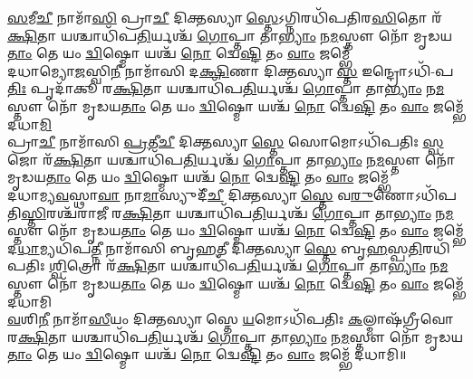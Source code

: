 \-\ul{𑌸}\-𑌮𑍀\-\ul{𑌚𑍀} 𑌨𑌾𑌮𑌾᳴\-\ul{𑌸𑌿} 𑌪𑍍𑌰𑌾\-\ul{𑌚𑍀} 𑌦𑌿𑌕𑍍𑌤𑌸𑍍𑌯𑌾\-\ul{𑌸𑍍𑌤𑍇}\-𑌽𑌗𑍍𑌨𑌿𑌰𑌧𑌿᳴\-𑌪𑌤𑌿𑌰\-\ul{𑌸𑌿}\-𑌤𑍋 𑌰᳴\-\ul{𑌕𑍍𑌷𑌿}\-𑌤𑌾 
𑌯𑌶𑍍𑌚𑌾𑌧𑌿᳴𑌪\-\ul{𑌤𑌿}\-𑌰𑍍𑌯𑌶𑍍𑌚᳴ \ul{𑌗𑍋}\-𑌪𑍍𑌤𑌾 𑌤𑌾\-\ul{𑌭𑍍𑌯𑌾𑌂} 𑌨\-\ul{𑌮}\-𑌸𑍍𑌤𑍗 𑌨𑍋᳴ 𑌮𑍃𑌡𑌯\-\ul{𑌤𑌾𑌂} 𑌤𑍇 
𑌯𑌂 \ul{𑌦𑍍𑌵𑌿}\-𑌷𑍍𑌮𑍋 𑌯𑌶𑍍𑌚᳴ \ul{𑌨𑍋} 𑌦𑍍𑌵𑍇\-\ul{𑌷𑍍𑌟𑌿} 𑌤𑌂 \ul{𑌵𑌾𑌂} 𑌜𑌮𑍍𑌭𑍇᳴\\
𑌦𑌧𑌾𑌮𑍍𑌯𑍋\-\ul{𑌜}\-𑌸𑍍𑌵𑌿\-\ul{𑌨𑍀} 𑌨𑌾𑌮𑌾᳴𑌸𑌿 𑌦\-\ul{𑌕𑍍𑌷𑌿}\-𑌣𑌾 𑌦𑌿𑌕𑍍𑌤𑌸𑍍𑌯𑌾\-\ul{𑌸𑍍𑌤} 𑌇𑌨𑍍𑌦𑍍𑌰𑍋𑌽𑌧𑌿᳴-𑌪\-\ul{𑌤𑌿𑌃} 𑌪𑍃𑌦𑌾᳴𑌕𑍂 𑌰\-\ul{𑌕𑍍𑌷𑌿}\-𑌤𑌾 
𑌯𑌶𑍍𑌚𑌾𑌧𑌿᳴𑌪\-\ul{𑌤𑌿}\-𑌰𑍍𑌯𑌶𑍍𑌚᳴ \ul{𑌗𑍋}\-𑌪𑍍𑌤𑌾 𑌤𑌾\-\ul{𑌭𑍍𑌯𑌾𑌂} 𑌨\-\ul{𑌮}\-𑌸𑍍𑌤𑍗 𑌨𑍋᳴ 𑌮𑍃𑌡𑌯\-\ul{𑌤𑌾𑌂} 𑌤𑍇 
𑌯𑌂 \ul{𑌦𑍍𑌵𑌿}\-𑌷𑍍𑌮𑍋 𑌯𑌶𑍍𑌚᳴ \ul{𑌨𑍋} 𑌦𑍍𑌵𑍇\-\ul{𑌷𑍍𑌟𑌿} 𑌤𑌂 \ul{𑌵𑌾𑌂} 𑌜𑌮𑍍𑌭𑍇᳴ 𑌦𑌧𑌾\-\ul{𑌮𑌿}\-\\ 
𑌪𑍍𑌰𑌾\-\ul{𑌚𑍀} 𑌨𑌾𑌮𑌾᳴𑌸𑌿 \ul{𑌪𑍍𑌰}\-𑌤𑍀\-\ul{𑌚𑍀} 𑌦𑌿𑌕𑍍𑌤𑌸𑍍𑌯𑌾\-\ul{𑌸𑍍𑌤𑍇} 𑌸𑍋𑌮𑍋𑌽𑌧𑌿᳴\-𑌪𑌤𑌿𑌃 \ul{𑌸𑍍𑌵}\-𑌜𑍋 𑌰᳴\-\ul{𑌕𑍍𑌷𑌿}\-𑌤𑌾 
𑌯𑌶𑍍𑌚𑌾𑌧𑌿᳴𑌪\-\ul{𑌤𑌿}\-𑌰𑍍𑌯𑌶𑍍𑌚᳴ \ul{𑌗𑍋}\-𑌪𑍍𑌤𑌾 𑌤𑌾\-\ul{𑌭𑍍𑌯𑌾𑌂} 𑌨\-\ul{𑌮}\-𑌸𑍍𑌤𑍗 𑌨𑍋᳴ 𑌮𑍃𑌡𑌯\-\ul{𑌤𑌾𑌂} 𑌤𑍇 
𑌯𑌂 \ul{𑌦𑍍𑌵𑌿}\-𑌷𑍍𑌮𑍋 𑌯𑌶𑍍𑌚᳴ \ul{𑌨𑍋} 𑌦𑍍𑌵𑍇\-\ul{𑌷𑍍𑌟𑌿} 𑌤𑌂 \ul{𑌵𑌾𑌂} 𑌜𑌮𑍍𑌭𑍇᳴\\
𑌦𑌧𑌾𑌮𑍍𑌯\-\ul{𑌵}\-𑌸𑍍𑌥𑌾\-\ul{𑌵𑌾} 𑌨𑌾\-\ul{𑌮𑌾}\-𑌸𑍍𑌯𑍁𑌦𑍀᳴\-\ul{𑌚𑍀} 𑌦𑌿𑌕𑍍𑌤𑌸𑍍𑌯𑌾\-\ul{𑌸𑍍𑌤𑍇} 𑌵\-\ul{𑌰𑍁}\-𑌣𑍋𑌽𑌧𑌿᳴\-𑌪𑌤𑌿\-\ul{𑌸𑍍𑌤𑌿}\-𑌰𑌶𑍍𑌚᳴𑌰𑌾𑌜𑍀 𑌰\-\ul{𑌕𑍍𑌷𑌿}\-𑌤𑌾 
𑌯𑌶𑍍𑌚𑌾𑌧𑌿᳴𑌪\-\ul{𑌤𑌿}\-𑌰𑍍𑌯𑌶𑍍𑌚᳴ \ul{𑌗𑍋}\-𑌪𑍍𑌤𑌾 𑌤𑌾\-\ul{𑌭𑍍𑌯𑌾𑌂} 𑌨\-\ul{𑌮}\-𑌸𑍍𑌤𑍗 𑌨𑍋᳴ 𑌮𑍃𑌡𑌯\-\ul{𑌤𑌾𑌂} 𑌤𑍇 
𑌯𑌂 \ul{𑌦𑍍𑌵𑌿}\-𑌷𑍍𑌮𑍋 𑌯𑌶𑍍𑌚᳴ \ul{𑌨𑍋} 𑌦𑍍𑌵𑍇\-\ul{𑌷𑍍𑌟𑌿} 𑌤𑌂 \ul{𑌵𑌾𑌂} 𑌜𑌮𑍍𑌭𑍇᳴\\
𑌦\-\ul{𑌧𑌾}\-𑌮𑍍𑌯𑌧𑌿᳴𑌪\-\ul{𑌤𑍍𑌨𑍀} 𑌨𑌾𑌮𑌾᳴𑌸𑌿 𑌬𑍃\-\ul{𑌹}\-𑌤𑍀 𑌦𑌿𑌕𑍍𑌤𑌸𑍍𑌯𑌾\-\ul{𑌸𑍍𑌤𑍇} 𑌬𑍃\-\ul{𑌹}\-𑌸𑍍𑌪\-\ul{𑌤𑌿}\-𑌰𑌧𑌿᳴𑌪𑌤𑌿𑌃 \ul{𑌶𑍍𑌵𑌿}\-𑌤𑍍𑌰𑍋 𑌰᳴\-\ul{𑌕𑍍𑌷𑌿}\-𑌤𑌾 
𑌯𑌶𑍍𑌚𑌾𑌧𑌿᳴𑌪\-\ul{𑌤𑌿}\-𑌰𑍍𑌯𑌶𑍍𑌚᳴ \ul{𑌗𑍋}\-𑌪𑍍𑌤𑌾 𑌤𑌾\-\ul{𑌭𑍍𑌯𑌾𑌂} 𑌨\-\ul{𑌮}\-𑌸𑍍𑌤𑍗 𑌨𑍋᳴ 𑌮𑍃𑌡𑌯\-\ul{𑌤𑌾𑌂} 𑌤𑍇 
𑌯𑌂 \ul{𑌦𑍍𑌵𑌿}\-𑌷𑍍𑌮𑍋 𑌯𑌶𑍍𑌚᳴ \ul{𑌨𑍋} 𑌦𑍍𑌵𑍇\-\ul{𑌷𑍍𑌟𑌿} 𑌤𑌂 \ul{𑌵𑌾𑌂} 𑌜𑌮𑍍𑌭𑍇᳴ 𑌦𑌧𑌾𑌮𑌿\\
\-\ul{𑌵}\-𑌶𑌿\-\ul{𑌨𑍀} 𑌨𑌾𑌮𑌾᳴\-\ul{𑌸𑍀}\-𑌯𑌂 𑌦𑌿𑌕𑍍𑌤𑌸𑍍𑌯𑌾𑌸𑍍𑌤𑍇 \ul{𑌯}\-𑌮𑍋𑌽𑌧𑌿᳴𑌪𑌤𑌿𑌃 \ul{𑌕}\-𑌲𑍍𑌮𑌾𑌷᳴𑌗𑍍𑌰𑍀𑌵𑍋 𑌰\-\ul{𑌕𑍍𑌷𑌿}\-𑌤𑌾 
𑌯𑌶𑍍𑌚𑌾𑌧𑌿᳴𑌪\-\ul{𑌤𑌿}\-𑌰𑍍𑌯𑌶𑍍𑌚᳴ \ul{𑌗𑍋}\-𑌪𑍍𑌤𑌾 𑌤𑌾\-\ul{𑌭𑍍𑌯𑌾𑌂} 𑌨\-\ul{𑌮}\-𑌸𑍍𑌤𑍗 𑌨𑍋᳴ 𑌮𑍃𑌡𑌯\-\ul{𑌤𑌾𑌂} 𑌤𑍇 
𑌯𑌂 \ul{𑌦𑍍𑌵𑌿}\-𑌷𑍍𑌮𑍋 𑌯𑌶𑍍𑌚᳴ \ul{𑌨𑍋} 𑌦𑍍𑌵𑍇\-\ul{𑌷𑍍𑌟𑌿} 𑌤𑌂 \ul{𑌵𑌾𑌂} 𑌜𑌮𑍍𑌭𑍇᳴ 𑌦𑌧𑌾𑌮𑌿॥

